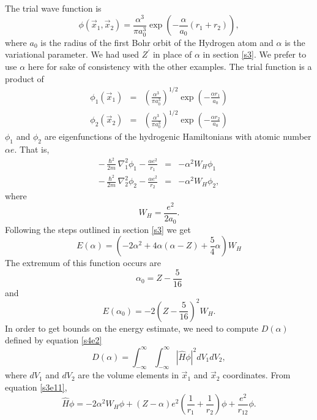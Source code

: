 \documentclass{article}
\numberwithin{equation}{section}
\begin{document}
The trial wave function is
\begin{equation}\label{s5e49}
\phi(\vec{x}_1, \vec{x}_2) = \frac{\alpha^3}{\pi a_0^3}
\exp\left(-\frac{\alpha}{a_0}(r_1 + r_2)\right),
\end{equation}
where $a_0$ is the radius of the first Bohr orbit of the Hydrogen atom
and $\alpha$ is the variational parameter. We had used $Z^\prime$ in place
of $\alpha$ in section \ref{s3}. We prefer to use $\alpha$ here for sake
of consistency with the other examples. The trial function is a product of
\begin{eqnarray}
\phi_1(\vec{x}_1) &=& \left(\frac{\alpha^{3}}{\pi a_0^3}\right)^{1/2}
\exp\left(-\frac{\alpha r_1}{a_0}\right) \label{s5e50} \\
\phi_2(\vec{x}_2) &=& \left(\frac{\alpha^{3}}{\pi a_0^3}\right)^{1/2}
\exp\left(-\frac{\alpha r_2}{a_0}\right) \label{s5e51}
\end{eqnarray}
$\phi_1$ and $\phi_2$ are eigenfunctions of the hydrogenic Hamiltonians 
with atomic number $\alpha e$. That is,
\begin{eqnarray}
-\frac{\hslash^2}{2m}\nabla_1^2\phi_1 - \frac{\alpha e^2}{r_1} &=& 
-\alpha^2W_H\phi_1 \label{s5e52} \\
-\frac{\hslash^2}{2m}\nabla_2^2\phi_2 - \frac{\alpha e^2}{r_2} &=& 
-\alpha^2W_H\phi_2 \label{s5e53}, 
\end{eqnarray}
where 
\begin{equation}\label{s5e54}
W_H = \frac{e^2}{2a_0}.
\end{equation}
Following the steps outlined in section \ref{s3} we get
\begin{equation}\label{s5e55}
E(\alpha) = 
\left(-2\alpha^2 + 4\alpha(\alpha - Z) + \frac{5}{4}\alpha\right)W_H
\end{equation}
The extremum of this function occurs are
\begin{equation}\label{s5e56}
\alpha_0 = Z - \frac{5}{16}
\end{equation}
and
\begin{equation}\label{s5e57}
E(\alpha_0) = -2\left(Z - \frac{5}{16}\right)^2 W_H.
\end{equation}
In order to get bounds on the energy estimate, we need to compute
$D(\alpha)$ defined by equation \eqref{s4e2}
\[
D(\alpha) = \int_{-\infty}^\infty \int_{-\infty}^\infty 
|\hat{H}\phi|^2 dV_1 dV_2,
\]
where $dV_1$ and $dV_2$ are the volume elements in $\vec{x}_1$ and 
$\vec{x}_2$ coordinates. From equation \eqref{s3e11},
\[
\hat{H}\phi = -2\alpha^2W_H\phi + (Z - \alpha)e^2\left(\frac{1}{r_1}
+ \frac{1}{r_2}\right)\phi + \frac{e^2}{r_{12}}\phi.
\]
\end{document}
